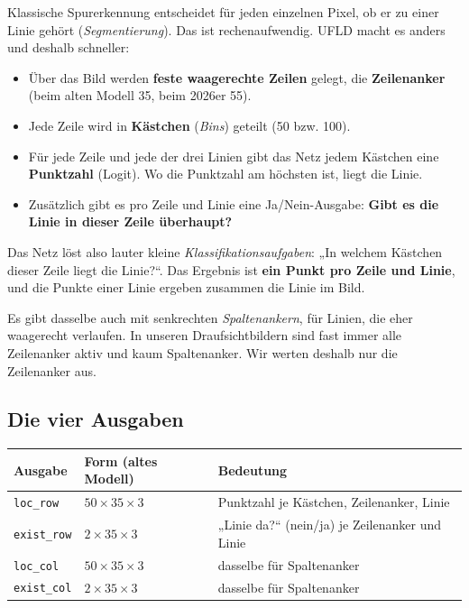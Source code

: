 \documentclass[11pt,a4paper]{article}
\newcommand{\code}[1]{\texttt{#1}}
\begin{document}
Klassische Spurerkennung entscheidet für jeden einzelnen Pixel, ob er zu einer Linie gehört
(\emph{Segmentierung}). Das ist rechenaufwendig. UFLD macht es anders und deshalb schneller:

\begin{itemize}
  \item Über das Bild werden \textbf{feste waagerechte Zeilen} gelegt, die \textbf{Zeilenanker}
        (beim alten Modell 35, beim 2026er 55).
  \item Jede Zeile wird in \textbf{Kästchen} (\emph{Bins}) geteilt (50 bzw. 100).
  \item Für jede Zeile und jede der drei Linien gibt das Netz jedem Kästchen eine
        \textbf{Punktzahl} (Logit). Wo die Punktzahl am höchsten ist, liegt die Linie.
  \item Zusätzlich gibt es pro Zeile und Linie eine Ja/Nein-Ausgabe: \textbf{Gibt es die Linie in
        dieser Zeile überhaupt?}
\end{itemize}

Das Netz löst also lauter kleine \emph{Klassifikationsaufgaben}: „In welchem Kästchen dieser
Zeile liegt die Linie?“. Das Ergebnis ist \textbf{ein Punkt pro Zeile und Linie}, und die Punkte
einer Linie ergeben zusammen die Linie im Bild.

Es gibt dasselbe auch mit senkrechten \emph{Spaltenankern}, für Linien, die eher waagerecht
verlaufen. In unseren Draufsichtbildern sind fast immer alle Zeilenanker aktiv und kaum
Spaltenanker. Wir werten deshalb nur die Zeilenanker aus.

\subsection{Die vier Ausgaben}

\begin{center}
\begin{tabular}{lll}
\toprule
Ausgabe & Form (altes Modell) & Bedeutung \\
\midrule
\code{loc\_row}   & $50 \times 35 \times 3$ & Punktzahl je Kästchen, Zeilenanker, Linie \\
\code{exist\_row} & $2 \times 35 \times 3$  & „Linie da?“ (nein/ja) je Zeilenanker und Linie \\
\code{loc\_col}   & $50 \times 35 \times 3$ & dasselbe für Spaltenanker \\
\code{exist\_col} & $2 \times 35 \times 3$  & dasselbe für Spaltenanker \\
\bottomrule
\end{tabular}
\end{center}
\end{document}
